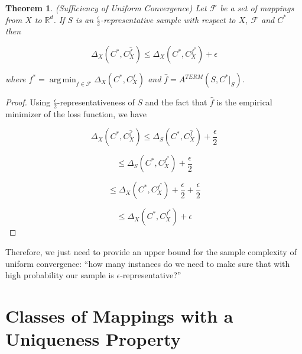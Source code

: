 \documentclass[letterpaper,12pt,titlepage,oneside,final]{book}
\DeclareMathOperator*{\argmin}{arg\,min}
\newtheorem{theorem}{Theorem}
\begin{document}
\begin{theorem} \label{ERMT}{(Sufficiency of Uniform Convergence)} Let $\mathcal{F}$ be a set of mappings from $X$ to $\mathbb{R}^d$. If $S$ is an $\frac{\epsilon}{2}$-representative sample with respect to $X$, $\mathcal{F}$ and $C^*$ then 

\begin{equation}
\Delta_X(C^*, C^{\hat{f}}_X) \leq \Delta_X(C^*, C^{f^*}_X) + \epsilon
\end{equation}

where $f^* = \argmin_{f\in \mathcal{F}} \Delta_X(C^*, C^f_X)$ and $\hat{f} = A^{TERM}(S,C^*\Big|_S)$.

\end{theorem}

\begin{proof}

Using $\frac{\epsilon}{2}$-representativeness of $S$ and the fact that $\hat{f}$ is the empirical minimizer of the loss function, we have



\begin{equation}
\Delta_X(C^*, C^{\hat{f}}_X) \leq \Delta_S(C^*, C^{\hat{f}}_X) + \frac{\epsilon}{2}
\end{equation}


\begin{equation}
\leq \Delta_S(C^*, C^{f^*}_X) + \frac{\epsilon}{2} 
\end{equation}


\begin{equation}
\leq \Delta_X(C^*, C^{f^*}_X) + \frac{\epsilon}{2}  + \frac{\epsilon}{2}
\end{equation}

\begin{equation}
\leq \Delta_X(C^*, C^{f^*}_X) + \epsilon
\end{equation}


\end{proof}


Therefore, we just need to provide an upper bound for the sample complexity of uniform convergence: ``how many instances do we need to make sure that with high probability our sample is $\epsilon$-representative?''




\section{Classes of Mappings with a Uniqueness Property}
\label{UNIQUE}
\end{document}
